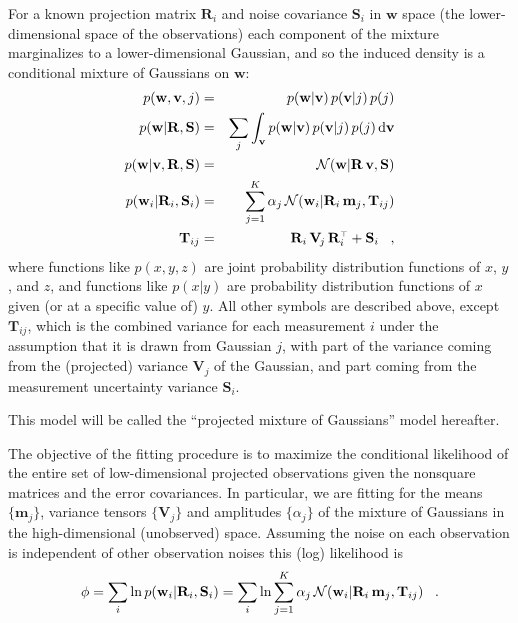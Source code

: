 \documentclass[12pt,preprint]{aastex}
\newcommand{\normal}{{\cal N}}
\renewcommand{\vec}[1]{\mathbf{#1}} %
\newcommand{\mm}{\vec{m}}
\newcommand{\vv}{\vec{v}}
\newcommand{\ww}{\vec{w}}
\newcommand{\mmj}{\mm_j}
\newcommand{\wwi}{\ww_i}
\newcommand{\ten}[1]{\mathbf{#1}} %
\newcommand{\RR}{\ten{R}}
\renewcommand{\SS}{\ten{S}}
\newcommand{\TT}{\ten{T}}
\newcommand{\VV}{\ten{V}}
\newcommand{\RRi}{\RR_i}
\newcommand{\SSi}{\SS_i}
\newcommand{\VVj}{\VV_{\!j}} %
\newcommand{\TTij}{\TT_{ij}}
\newcommand{\T}{^{\scriptscriptstyle \top}}   %
\newcommand{\alphaj}{\alpha_j}
\begin{document}
For a known projection matrix $\RRi$ and noise covariance $\SSi$ in
$\ww$ space (the lower-dimensional space of the observations) each
component of the mixture marginalizes to a lower-dimensional Gaussian,
and so the induced density is a conditional mixture of Gaussians on
$\ww$:
\begin{eqnarray}\displaystyle
      p(\ww,\vv,j) &=& p(\ww|\vv)\,p(\vv|j)\,p(j)\nonumber \\
    p(\ww|\RR,\SS) &=& \sum_j \int_{\vv} p(\ww|\vv)\,p(\vv|j)\,p(j)\,
                       \mathrm{d}\vv\nonumber \\
p(\ww|\vv,\RR,\SS) &=& \normal(\ww|\RR\,\vv,\SS)\nonumber \\
 p(\wwi|\RRi,\SSi) &=& \sum_{j=1}^K \alphaj\,\normal(\wwi|\RRi\,\mmj,\TTij)\nonumber \\
             \TTij &=& \RRi\,\VVj\,\RRi\T+\SSi \;\;\;,
\end{eqnarray}
where functions like $p(x,y,z)$ are joint probability distribution
functions of $x$, $y$, and $z$, and functions like $p(x|y)$ are
probability distribution functions of $x$ given (or at a specific
value of) $y$.  All other symbols are described above, except $\TTij$,
which is the combined variance for each measurement $i$ under the
assumption that it is drawn from Gaussian $j$, with part of the
variance coming from the (projected) variance $\VVj$ of the Gaussian,
and part coming from the measurement uncertainty variance $\SSi$.

This model will be called the ``projected mixture of Gaussians'' model
hereafter.


The objective of the fitting procedure is to maximize the conditional
likelihood of the entire set of low-dimensional projected observations
given the nonsquare matrices and the error covariances. In particular,
we are fitting for the means $\{\mmj\}$, variance tensors $\{\VVj\}$
and amplitudes $\{\alpha_j\}$ of the mixture of Gaussians in the
high-dimensional (unobserved) space.  Assuming the noise on each
observation is independent of other observation noises this (log)
likelihood is
\begin{equation}
\phi = \sum_i \ln p(\wwi|\RRi,\SSi) = \sum_i \ln \sum_{j=1}^K \alphaj\,\normal(\wwi|\RRi\,\mmj,\TTij) \;\;\;.
\end{equation}
\end{document}
